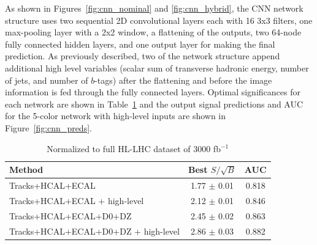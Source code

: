 As shown in Figures~\ref{fig:cnn_nominal} and \ref{fig:cnn_hybrid}, the CNN network structure uses two sequential 2D convolutional layers each with 16 3x3 filters, one max-pooling layer with a 2x2 window, a flattening of the outputs, two 64-node fully connected hidden layers, and one output layer for making the final prediction. As previously described, two of the network structure append additional high level variables (scalar sum of transverse hadronic energy, number of jets, and number of $b$-tags) after the flattening and before the image information is fed through the fully connected layers. Optimal significances for each network are shown in Table~\ref{tab:cnnResults} and the output signal predictions and AUC for the 5-color network with high-level inputs are shown in Figure~\ref{fig:cnn_preds}.

\begin{table}[h!]
\label{tab:cnnResults}
  \begin{center}
    \begin{tabular}{|l|c|c|} %
      \hline\hline
      \textbf{Method} & Best $S/\sqrt{B}$ & AUC \\
      \hline
      Tracks+HCAL+ECAL & 1.77 $\pm$ 0.01 & 0.818 \\
      Tracks+HCAL+ECAL + high-level & 2.12 $\pm$ 0.01 & 0.846 \\
      Tracks+HCAL+ECAL+D0+DZ & 2.45 $\pm$ 0.02 & 0.863 \\
      Tracks+HCAL+ECAL+D0+DZ + high-level & 2.86 $\pm$ 0.03 & 0.882 \\

      \hline\hline
    \end{tabular}
    \caption{Normalized to full HL-LHC dataset of 3000 fb$^{-1}$}
  \end{center}
\end{table}


